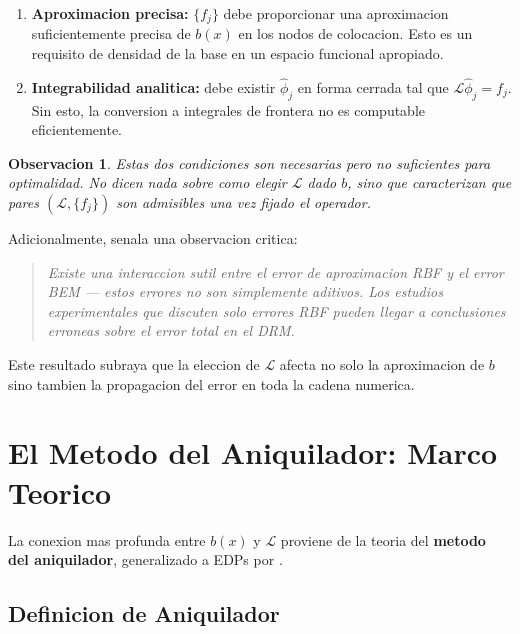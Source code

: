 \documentclass[12pt,a4paper]{article}
\newtheorem{remark}{Observacion}
\begin{document}
\begin{enumerate}
    \item \textbf{Aproximacion precisa:} $\{f_j\}$ debe proporcionar una
    aproximacion suficientemente precisa de $b(x)$ en los nodos de colocacion.
    Esto es un requisito de densidad de la base en un espacio funcional apropiado.

    \item \textbf{Integrabilidad analitica:} debe existir $\hat{\phi}_j$ en forma
    cerrada tal que $\mathcal{L}\hat{\phi}_j = f_j$. Sin esto, la conversion a
    integrales de frontera no es computable eficientemente.
\end{enumerate}

\begin{remark}
Estas dos condiciones son necesarias pero no suficientes para optimalidad.
No dicen nada sobre como elegir $\mathcal{L}$ dado $b$, sino que caracterizan
que pares $(\mathcal{L}, \{f_j\})$ son admisibles una vez fijado el operador.
\end{remark}

Adicionalmente, \cite{golberg1999rbf} senala una observacion critica:

\begin{quote}
\textit{Existe una interaccion sutil entre el error de aproximacion RBF y el
error BEM --- estos errores no son simplemente aditivos. Los estudios
experimentales que discuten solo errores RBF pueden llegar a conclusiones
erroneas sobre el error total en el DRM.}
\end{quote}

Este resultado subraya que la eleccion de $\mathcal{L}$ afecta no solo la
aproximacion de $b$ sino tambien la propagacion del error en toda la cadena
numerica.

\section{El Metodo del Aniquilador: Marco Teorico}

La conexion mas profunda entre $b(x)$ y $\mathcal{L}$ proviene de la teoria del
\textbf{metodo del aniquilador}, generalizado a EDPs por \cite{golberg1999annihilator}.

\subsection{Definicion de Aniquilador}
\end{document}
